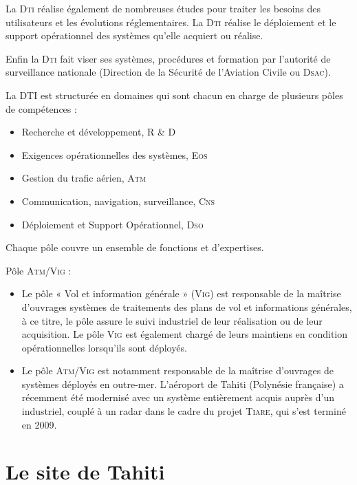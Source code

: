 La \textsc{Dti} réalise également de nombreuses études pour traiter les besoins des utilisateurs et les évolutions réglementaires. La \textsc{Dti} réalise le déploiement et le support opérationnel des systèmes qu’elle acquiert ou réalise. 

Enfin la \textsc{Dti} fait viser ses systèmes, procédures et formation par l’autorité de surveillance nationale (Direction de la Sécurité de l'Aviation Civile ou \textsc{Dsac}).

La DTI est structurée en domaines qui sont chacun en charge de plusieurs pôles de compétences :
\begin{itemize}
    \item Recherche et développement, R \& D
    \item Exigences opérationnelles des systèmes, \textsc{Eos}
    \item Gestion du trafic aérien, \textsc{Atm}
    \item Communication, navigation, surveillance, \textsc{Cns}
    \item Déploiement et Support Opérationnel, \textsc{Dso}
\end{itemize}\medskip

Chaque pôle couvre un ensemble de fonctions et d’expertises.

Pôle \textsc{Atm/Vig} :
\begin{itemize}
    \item Le pôle « Vol et information générale » (\textsc{Vig}) est responsable de la maîtrise d’ouvrages systèmes de traitements des plans de vol et informations générales, à ce titre, le pôle assure le suivi industriel de leur réalisation ou de leur acquisition. Le pôle \textsc{Vig} est également chargé de leurs maintiens en condition opérationnelles lorsqu’ils sont déployés.
    \item Le pôle \textsc{Atm/Vig} est notamment responsable de la maîtrise d’ouvrages de systèmes déployés en outre-mer. L’aéroport de Tahiti (Polynésie française) a récemment été modernisé avec un système entièrement acquis auprès d’un industriel, couplé à un radar dans le cadre du projet \textsc{Tiare}, qui s’est terminé en 2009.
\end{itemize}\medskip


\section{Le site de Tahiti}
